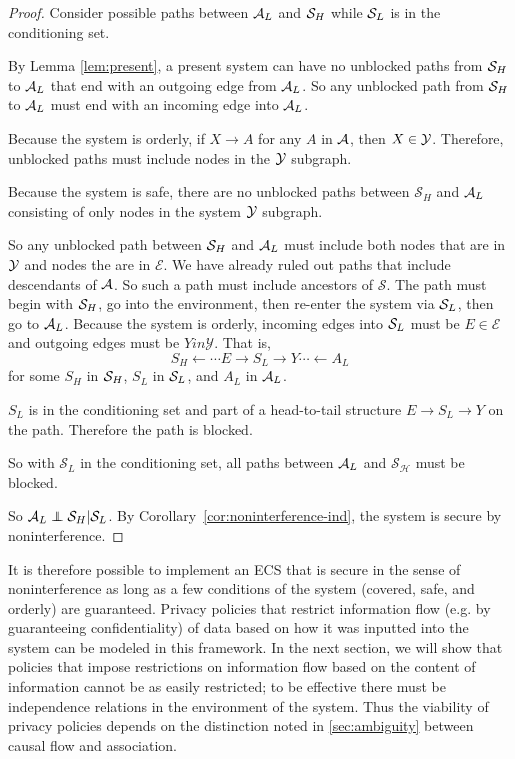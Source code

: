 \documentclass[../thesis.tex]{subfiles}
\begin{document}
\begin{proof}
  Consider possible paths between $\mathcal{A}_L$ and $\mathcal{S}_H$
  while $\mathcal{S}_L$ is in the conditioning set.

  By Lemma \ref{lem:present}, a present system
  can have no unblocked paths from $\mathcal{S}_H$ to $\mathcal{A}_L$
  that end with an outgoing edge from $\mathcal{A}_L$.
  So any unblocked path from $\mathcal{S}_H$ to $\mathcal{A}_L$ must
  end with an incoming edge into $\mathcal{A}_L$.

  Because the system is orderly,
  if $X \rightarrow A$ for any $A$ in $\mathcal{A}$, then $X \in \mathcal{Y}$.
  Therefore, unblocked paths must include nodes
  in the $\mathcal{Y}$ subgraph.
  
  Because the system is safe, there are no unblocked paths
  between $\mathcal{S}_H$ and $\mathcal{A}_L$ consisting of 
  only nodes in the system $\mathcal{Y}$ subgraph.

  So any unblocked path between $\mathcal{S}_H$ and $\mathcal{A}_L$ must include
  both nodes that are in $\mathcal{Y}$ and nodes the are in $\mathcal{E}$.
  We have already ruled out paths that include descendants
  of $\mathcal{A}$.
  So such a path must include ancestors of $\mathcal{S}$.
  The path must begin with $\mathcal{S}_H$, go into the environment,
  then re-enter the system via $\mathcal{S}_L$, then go to $\mathcal{A}_L$.
  Because the system is orderly, incoming edges into $\mathcal{S}_L$
  must be $E \in \mathcal{E}$ and outgoing edges must be
  $Y in \mathcal{Y}$.
  That is,
  $$S_H \leftarrow \cdots E \rightarrow S_L \rightarrow Y \cdots \leftarrow A_L$$
  for some $S_H$ in $\mathcal{S}_H$, $S_L$ in $\mathcal{S}_L$, and $A_L$ in $\mathcal{A}_L$.

  $S_L$ is in the conditioning set and part of a head-to-tail
  structure $E \rightarrow S_L \rightarrow Y$ on the path.
  Therefore the path is blocked.
  
  So with $\mathcal{S}_L$ in the conditioning set,
  all paths between
  $\mathcal{A}_L$ and $\mathcal{S_H}$ must be
  blocked.

  So $\A_L \independent \mc{S}_H \vert \mc{S}_L$.
  By Corollary~\ref{cor:noninterference-ind},
  the system is secure by noninterference.
\end{proof}

It is therefore possible to implement an ECS that is
secure in the sense of noninterference
as long as a few conditions of the system
(covered, safe, and orderly) are guaranteed.
Privacy policies that restrict information flow
(e.g. by guaranteeing confidentiality) of data
based on how it was inputted into the system can
be modeled in this framework.
In the next section, we will show that policies
that impose restrictions on information flow
based on the content of information cannot be
as easily restricted; to be effective there
must be independence relations in the environment
of the system.
Thus the viability of privacy policies depends
on the distinction noted in \ref{sec:ambiguity}
between causal flow and association.
\end{document}
